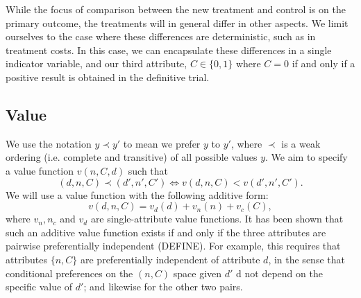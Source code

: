 \documentclass[sagev, Crown]{sagej}
\begin{document}
While the focus of comparison between the new treatment and control is on the primary outcome, the treatments will in general differ in other aspects. We limit ourselves to the case where these differences are deterministic, such as in treatment costs. In this case, we can encapsulate these differences in a single indicator variable, and our third attribute,  $C \in \{0, 1\}$ where $C = 0$ if and only if a positive result is obtained in the definitive trial. 

\subsection{Value}

We use the notation $y \prec y'$ to mean we prefer $y$ to $y'$, where $\prec$ is a weak ordering (i.e. complete and transitive) of all possible values $y$. We aim to specify a value function $v(n, C, d)$ such that
$$
(d, n, C) \prec (d', n', C') \Leftrightarrow v(d, n, C) < v(d', n', C').
$$
We will use a value function with the following additive form:
$$ 
v(d, n, C) =  v_d(d) + v_n(n) + v_c(C),
$$
where $v_n, n_c$ and $v_d$ are single-attribute value functions. It has been shown that such an additive value function exists if and only if the three attributes are pairwise preferentially independent (DEFINE). For example, this requires that attributes $\{n, C\}$ are preferentially independent of attribute $d$, in the sense that conditional preferences on the $(n, C)$ space given $d'$ d not depend on the specific value of $d'$; and likewise for the other two pairs.
\end{document}
